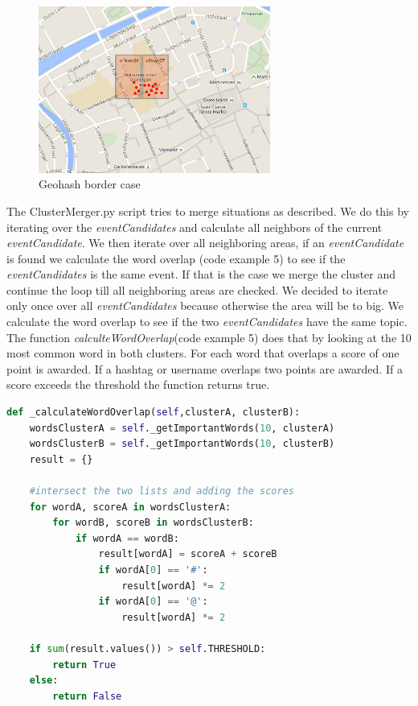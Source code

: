 \documentclass[
10pt, %
a4paper, %
oneside, %
headinclude,footinclude, %
BCOR5mm, %
]{scrartcl}
\begin{document}
\begin{figure}[htbp] %
   \centering
   \includegraphics[width=3in]{bordercase.png} 
   \caption{Geohash border case}
   \label{Geohash border case}
\end{figure}
The ClusterMerger.py script tries to merge situations as described.  We do this by iterating over the \textit{eventCandidates} and calculate all neighbors of the current \textit{eventCandidate}. We then iterate over all neighboring areas, if an \textit{eventCandidate} is found we calculate the word overlap (code example 5) to see if the \textit{eventCandidates} is the same event. If that is the case we merge the cluster and continue the loop till all neighboring areas are checked.
\vl
We decided to iterate only once over all \textit{eventCandidates} because otherwise the area will be to big.
\vl
We calculate the word overlap to see if the two \textit{eventCandidates} have the same topic.  The function \textit{calculteWordOverlap}(code example 5) does that by looking at the 10 most common word in both clusters. For each word that overlaps a score of one point is awarded. If a hashtag or username overlaps two points are awarded. If a score exceeds the threshold the function returns true. 

\begin{lstlisting}[language=Python, caption=Calculate word overlap]
def _calculateWordOverlap(self,clusterA, clusterB):      
    wordsClusterA = self._getImportantWords(10, clusterA)
    wordsClusterB = self._getImportantWords(10, clusterB)
    result = {}
    
    #intersect the two lists and adding the scores
    for wordA, scoreA in wordsClusterA:
        for wordB, scoreB in wordsClusterB:
            if wordA == wordB:
                result[wordA] = scoreA + scoreB
                if wordA[0] == '#':
                    result[wordA] *= 2
                if wordA[0] == '@':
                    result[wordA] *= 2

    if sum(result.values()) > self.THRESHOLD:
        return True
    else:
        return False
\end{lstlisting}
\end{document}

